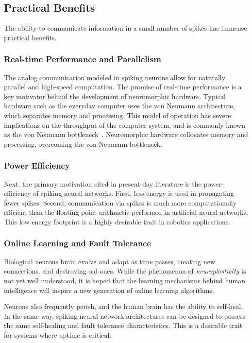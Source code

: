 \documentclass[fyp]{socreport}
\begin{document}
\subsection{Practical Benefits\label{sec:practical-benefits}}

The ability to communicate information in a small number of spikes has immense
practical benefits.

\subsubsection{Real-time Performance and Parallelism}

The analog communication modeled in spiking neurons allow for naturally parallel
and high-speed computation. The promise of real-time performance is a key
motivator behind the development of neuromorphic hardware. Typical hardware such
as the everyday computer uses the von Neumann architecture, which separates
memory and processing. This model of operation has severe implications on the
throughput of the computer system, and is commonly known as the von Neumann
bottleneck~\cite{Backus_1978}. Neuromorphic hardware collocates memory and
processing, overcoming the von Neumann bottleneck.

\subsubsection{Power Efficiency}

Next, the primary motivation cited in present-day literature is the
power-efficiency of spiking neural networks. First, less energy is used in
propagating fewer spikes. Second, communication via spikes is much more
computationally efficient than the floating point arithmetic performed in
artificial neural networks. This low energy footprint is a highly desirable
trait in robotics applications.

\subsubsection{Online Learning and Fault Tolerance}

Biological neurons brain evolve and adapt as time passes, creating new
connections, and destroying old ones. While the phenomenon of
\emph{neuroplasticity} is not yet well understood, it is hoped that the learning
mechanisms behind human intelligence will inspire a new generation of online
learning algorithms.

Neurons also frequently perish, and the human brain has the ability to
self-heal. In the same way, spiking neural network architectures can be designed
to possess the same self-healing and fault tolerance characteristics. This is a
desirable trait for systems where uptime is critical.
\end{document}

